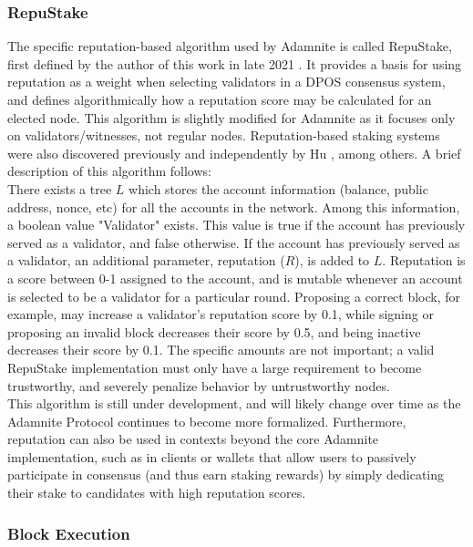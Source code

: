 \documentclass[conference]{IEEEtran}
\begin{document}
\subsubsection{RepuStake}
The specific reputation-based algorithm used by Adamnite is called RepuStake, first defined by the author of this work in late 2021 \cite{Chaudhury2021Reputsake}. It provides a basis for using reputation as a weight when selecting validators in a DPOS consensus system, and defines algorithmically how a reputation score may be calculated for an elected node. This algorithm is slightly modified for Adamnite as it focuses only on validators/witnesses, not regular nodes. Reputation-based staking systems were also discovered previously and independently by Hu \cite{Hu2020ImprovedDPOS}, among others. A brief description of this algorithm follows:\\
There exists a tree $L$ which stores the account information (balance, public address, nonce, etc) for all the accounts in the network. Among this information, a boolean value "Validator" exists. This value is true if the account has previously served as a validator, and false otherwise. If the account has previously served as a validator, an additional parameter, reputation ($R$), is added to $L$. Reputation is a score between 0-1 assigned to the account, and is mutable whenever an account is selected to be a validator for a particular round. Proposing a correct block, for example, may increase a validator's reputation score by 0.1, while signing or proposing an invalid block decreases their score by 0.5, and being inactive decreases their score by 0.1. The specific amounts are not important; a valid RepuStake implementation must only have a large requirement to become trustworthy, and severely penalize behavior by untrustworthy nodes.\\

This algorithm is still under development, and will likely change over time as the Adamnite Protocol continues to become more formalized. Furthermore, reputation can also be used in contexts beyond the core Adamnite implementation, such as in clients or wallets that allow users to passively participate in consensus (and thus earn staking rewards) by simply dedicating their stake to candidates with high reputation scores.

\subsubsection{Block Execution}
\end{document}
